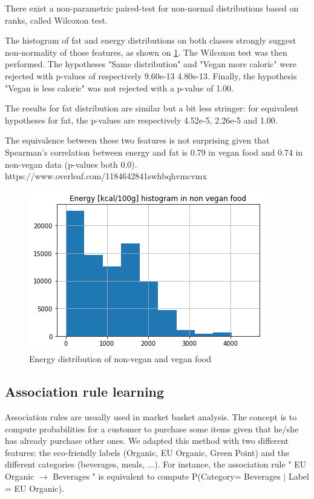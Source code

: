 \documentclass[11pt]{article}
\begin{document}
There exist a non-parametric paired-test for non-normal distributions based on ranks, called Wilcoxon test.

The histogram of fat and energy distributions on both classes strongly suggest non-normality of those features, as shown on \ref{fig:histo_comp}. The Wilcoxon test was then performed. The hypotheses "Same distribution" and "Vegan more caloric" were rejected with p-values of respectively  9.60e-13 4.80e-13. Finally, the hypothesis "Vegan is less caloric" was not rejected with a p-value of 1.00.

The results for fat distribution are similar but a bit less stringer: for equivalent hypotheses for fat, the p-values are respectively 4.52e-5, 2.26e-5 and 1.00.

The equivalence between these two features is not surprising given that Spearman's correlation between energy and fat is 0.79 in vegan food and 0.74 in non-vegan data (p-values both 0.0).
https://www.overleaf.com/1184642841swhbqhvmcvmx
\vspace{-0.3cm}
\begin{figure}[H]
    \centering
    \includegraphics[scale=0.37]{figures/non_vegan_energy.png}
    \caption{Energy distribution of non-vegan and vegan food}
    \label{fig:histo_comp}
\end{figure}


\subsection{Association rule learning}
Association rules are usually used in market basket analysis. The concept is to compute probabilities for a customer to purchase some items given that he/she has already purchase other ones.
We adapted this method with two different features: the eco-friendly  labels (Organic, EU Organic, Green Point) and the different categories (beverages, meals, ...). For instance, the association rule "  EU Organic $\rightarrow$ Beverages " is equivalent to compute P(Category= Beverages $|$ Label = EU Organic).
\end{document}
